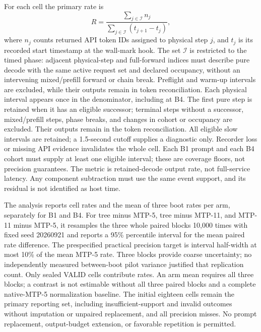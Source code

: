 \documentclass[conference]{IEEEtran}
\begin{document}
For each cell the primary rate is
\begin{equation}
 R = \frac{\sum_{j\in\mathcal{I}} n_j}
 {\sum_{j\in\mathcal{I}}(t_{j+1}-t_j)},
\end{equation}
where $n_j$ counts returned API token IDs assigned to physical step $j$, and $t_j$ is its recorded start timestamp at the wall-mark hook. The set $\mathcal{I}$ is restricted to the timed phase: adjacent physical-step and full-forward indices must describe pure decode with the same active request set and declared occupancy, without an intervening mixed/prefill forward or chain break. Preflight and warm-up intervals are excluded, while their outputs remain in token reconciliation. Each physical interval appears once in the denominator, including at B4. The first pure step is retained when it has an eligible successor; terminal steps without a successor, mixed/prefill steps, phase breaks, and changes in cohort or occupancy are excluded. Their outputs remain in the token reconciliation. All eligible slow intervals are retained; a 1.5-second cutoff supplies a diagnostic only. Recorder loss or missing API evidence invalidates the whole cell. Each B1 prompt and each B4 cohort must supply at least one eligible interval; these are coverage floors, not precision guarantees. The metric is retained-decode output rate, not full-service latency. Any component subtraction must use the same event support, and its residual is not identified as host time.

The analysis reports cell rates and the mean of three boot rates per arm, separately for B1 and B4. For tree minus MTP-5, tree minus MTP-11, and MTP-11 minus MTP-5, it resamples the three whole paired blocks 10,000 times with fixed seed 20260921 and reports a 95\% percentile interval for the mean paired rate difference. The prespecified practical precision target is interval half-width at most 10\% of the mean MTP-5 rate. Three blocks provide coarse uncertainty; no independently measured between-boot pilot variance justified that replication count. Only sealed VALID cells contribute rates. An arm mean requires all three blocks; a contrast is not estimable without all three paired blocks and a complete native-MTP-5 normalization baseline. The initial eighteen cells remain the primary reporting set, including insufficient-support and invalid outcomes without imputation or unpaired replacement, and all precision misses. No prompt replacement, output-budget extension, or favorable repetition is permitted.
\end{document}
